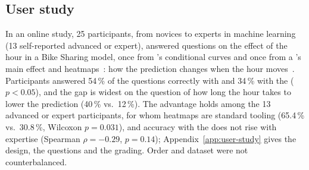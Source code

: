 \subsection{User study}\label{sec:user-study}
In an online study, 25 participants, from novices to experts in machine learning (13 self-reported advanced or expert), answered questions on the effect of the hour in a Bike Sharing model, once from \method{}'s conditional curves and once from a \gamm{}'s main effect and heatmaps~\cite{hegselmann2020evaluation}: how the prediction changes when the hour moves~\cite{hase2020evaluating}.
Participants answered 54\,\% of the questions correctly with \method{} and 34\,\% with the \gamm{} ($p<0.05$), and the gap is widest on the question of how long the hour takes to lower the prediction (40\,\% vs.\ 12\,\%).
The advantage holds among the 13 advanced or expert participants, for whom heatmaps are standard tooling (65.4\,\% vs.\ 30.8\,\%, Wilcoxon $p=0.031$), and accuracy with the \gamm{} does not rise with expertise (Spearman $\rho=-0.29$, $p=0.14$); Appendix~\ref{app:user-study} gives the design, the questions and the grading. Order and dataset were not counterbalanced.
